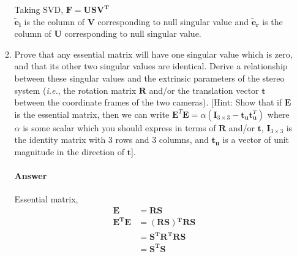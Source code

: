 \documentclass[11pt]{article}
\begin{document}
\begin{enumerate}
\begin{enumerate}
Taking SVD, $\mathbf{F} = \mathbf{USV^T}$ \\
$\mathbf{\widetilde{e}_l}$ is the column of $\mathbf{V}$ corresponding to null singular value and $\mathbf{\widetilde{e}_r}$ is the column of $\mathbf{U}$ corresponding to null singular value.\\
\item Prove that any essential matrix will have one singular value which is zero, and that its other two singular values are identical. Derive a relationship between these singular values and the extrinsic parameters of the stereo system (\textit{i.e.}, the rotation matrix $\textbf{R}$ and/or the translation vector $\textbf{t}$ between the coordinate frames of the two cameras). [Hint: Show that if $\textbf{E}$ is the essential matrix, then we can write $\textbf{E}^T \textbf{E} = \alpha (\textbf{I}_{3 \times 3} - \textbf{t}_\textbf{u} \textbf{t}^T_\textbf{u})$ where $\alpha$ is some scalar which you should express in terms of $\textbf{R}$ and/or $\textbf{t}$, $\textbf{I}_{3 \times 3}$  is the identity matrix with 3 rows and 3 columns, and $\textbf{t}_\textbf{u}$ is a vector of unit magnitude in the direction of $\textbf{t}$].
\paragraph{Answer}
Essential matrix,
\begin{align*}
\mathbf{E} &= \mathbf{RS} \\
\mathbf{E^TE} &= (\mathbf{RS})\mathbf{^TRS} \\
 &= \mathbf{S^TR^TRS} \\
 &= \mathbf{S^TS}\\
\end{align*}


\end{enumerate}
\end{enumerate}
\end{document}
